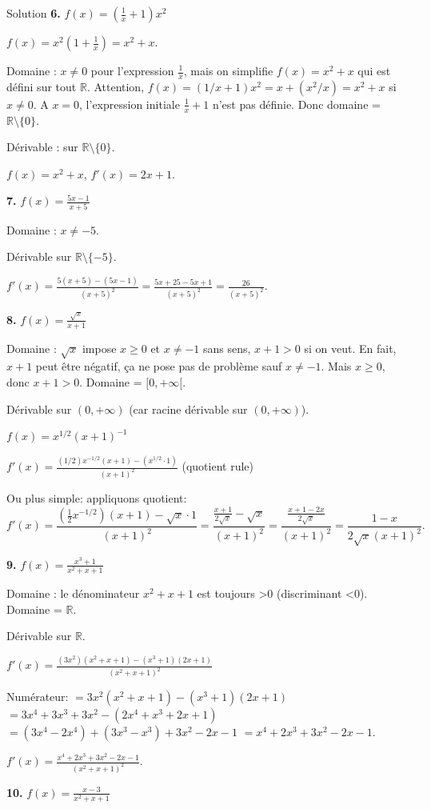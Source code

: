\documentclass[a4paper,12pt]{article}
\begin{document}
\begin{solutionbox}{Solution}
\textbf{6.} $f(x)=\left(\frac{1}{x}+1\right)x^2$

$f(x)=x^2\left(1+\frac{1}{x}\right)=x^2 + x$.

Domaine : $x \neq 0$ pour l’expression $\frac{1}{x}$, mais on simplifie $f(x)=x^2+x$ qui est défini sur tout $\mathbb{R}$. Attention, $f(x)= (1/x+1)x^2 = x+(x^2/x) = x^2 + x$ si $x\neq 0$. A $x=0$, l’expression initiale $\frac{1}{x}+1$ n’est pas définie. Donc domaine = $\mathbb{R}\setminus\{0\}$.

Dérivable : sur $\mathbb{R}\setminus\{0\}$.

$f(x)=x^2+x$, $f'(x)=2x+1$.

\textbf{7.} $f(x)=\frac{5x-1}{x+5}$

Domaine : $x \neq -5$.

Dérivable sur $\mathbb{R}\setminus\{-5\}$.

$f'(x)=\frac{5(x+5)-(5x-1)}{(x+5)^2}=\frac{5x+25-5x+1}{(x+5)^2}=\frac{26}{(x+5)^2}$.

\textbf{8.} $f(x)=\frac{\sqrt{x}}{x+1}$

Domaine : $\sqrt{x}$ impose $x\geq 0$ et $x\neq -1$ sans sens, $x+1>0$ si on veut. En fait, $x+1$ peut être négatif, ça ne pose pas de problème sauf $x \neq -1$. Mais $x\geq 0$, donc $x+1>0$. Domaine = $[0,+\infty[$.

Dérivable sur $(0,+\infty)$ (car racine dérivable sur $(0,+\infty)$).

$f(x)=x^{1/2}(x+1)^{-1}$

$f'(x)=\frac{(1/2)x^{-1/2}(x+1)-(x^{1/2}\cdot 1)}{(x+1)^2}$ (quotient rule)

Ou plus simple: appliquons quotient:
\[
f'(x)=\frac{( \tfrac{1}{2}x^{-1/2})(x+1)-\sqrt{x}\cdot 1}{(x+1)^2}=\frac{\frac{x+1}{2\sqrt{x}} - \sqrt{x}}{(x+1)^2}
=\frac{\frac{x+1 -2x}{2\sqrt{x}}}{(x+1)^2}
=\frac{1 - x}{2\sqrt{x}(x+1)^2}.
\]

\textbf{9.} $f(x)=\frac{x^3+1}{x^2+x+1}$

Domaine : le dénominateur $x^2+x+1$ est toujours >0 (discriminant <0). Domaine = $\mathbb{R}$.

Dérivable sur $\mathbb{R}$.

$f'(x)=\frac{(3x^2)(x^2+x+1)-(x^3+1)(2x+1)}{(x^2+x+1)^2}$

Numérateur:
$=3x^2(x^2+x+1)-(x^3+1)(2x+1)$
$=3x^4+3x^3+3x^2-(2x^4+x^3+2x+1)$
$=(3x^4-2x^4)+(3x^3 - x^3) +3x^2 -2x -1$
$=x^4+2x^3+3x^2 -2x -1$.

$f'(x)=\frac{x^4+2x^3+3x^2 -2x -1}{(x^2+x+1)^2}$.

\textbf{10.} $f(x)=\frac{x -3}{x^2+x+1}$


\end{solutionbox}
\end{document}

